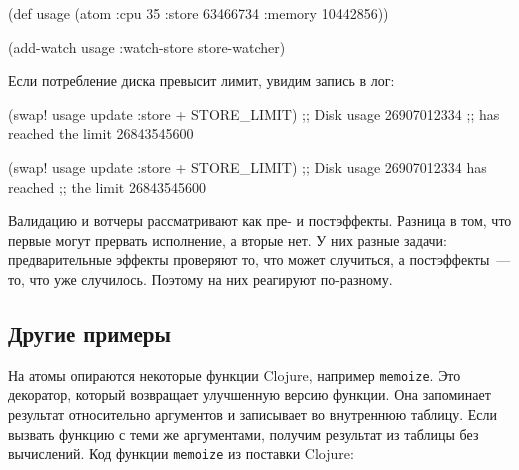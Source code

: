 \else

\begin{english}
  \begin{clojure}
(def usage
  (atom {:cpu 35
         :store 63466734
         :memory 10442856}))

(add-watch usage :watch-store store-watcher)
  \end{clojure}
\end{english}

\fi

\noindent
Если потребление диска превысит лимит, увидим запись в лог:

\ifnarrow

\begin{english}
  \begin{clojure}
(swap! usage update :store + STORE_LIMIT)
;; Disk usage 26907012334
;; has reached the limit 26843545600
  \end{clojure}
\end{english}

\else

\begin{english}
  \begin{clojure}
(swap! usage update :store + STORE_LIMIT)
;; Disk usage 26907012334 has reached
;; the limit 26843545600
  \end{clojure}
\end{english}

\fi

Валидацию и вотчеры рассматривают как пре- и постэффекты. Разница в том, что
первые могут прервать исполнение, а вторые нет. У них разные задачи:
предварительные эффекты проверяют то, что может случиться, а постэффекты~--- то,
что уже случилось. Поэтому на них реагируют по-разному.

\subsection{Другие примеры}


На атомы опираются некоторые функции Clojure, например \verb|memoize|. Это
декоратор, который возвращает улучшенную версию функции. Она запоминает
результат относительно аргументов и записывает во внутреннюю таблицу. Если
вызвать функцию с теми же аргументами, получим результат из таблицы без
вычислений. Код функции \verb|memoize| из поставки Clojure:


